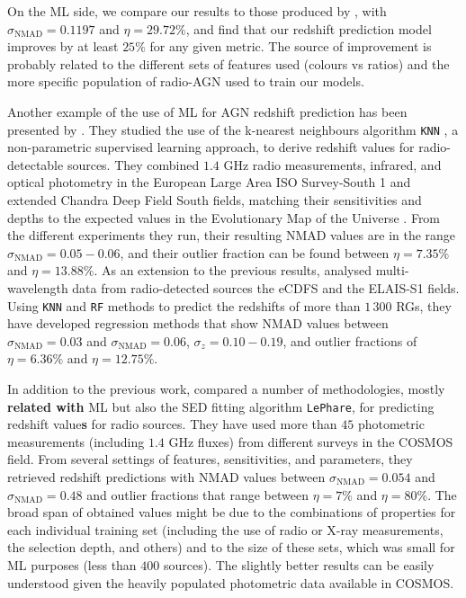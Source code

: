\documentclass{aa}
\begin{document}
On the ML side, we compare our results to those produced by \citet{2021Galax...9...86C}, with $\sigma_{\mathrm{NMAD}} = 0.1197$ and $\eta = 29.72 \%$, and find that our redshift prediction model improves by at least $25 \%$ for any given metric.
The source of improvement is probably related to the different sets of features used (colours vs ratios) and the more specific population of radio-AGN used to train our models.

Another example of the use of ML for AGN redshift prediction has been presented by \citet{2019PASP..131j8003L}. They studied the use of the k-nearest neighbours algorithm \verb|KNN| \citep{1053964}, a non-parametric supervised learning approach, to derive redshift values for radio-detectable sources. They combined $1.4$ GHz radio measurements, infrared, and optical photometry in the European Large Area ISO Survey-South 1 \citep[ELAIS-S1;][]{2000MNRAS.316..749O} and extended Chandra Deep Field South \citep[eCDFS;][]{2005ApJS..161...21L} fields, matching their sensitivities and depths to the expected values in the Evolutionary Map of the Universe \citep[EMU;][]{2011PASA...28..215N}. From the different experiments they run, their resulting NMAD values are in the range ${\sigma_{\mathrm{NMAD}} = 0.05 - 0.06}$, and their outlier fraction can be found between ${\eta = 7.35 \%}$ and ${\eta = 13.88 \%}$. 
As an extension to the previous results, \citet{LUKEN2022100557} analysed multi-wavelength data from radio-detected sources the eCDFS and the ELAIS-S1 fields. Using \texttt{KNN} and \texttt{RF} methods to predict the redshifts of more than $1\,300$ RGs, they have developed regression methods that show NMAD values between ${\sigma_{\mathrm{NMAD}} = 0.03}$ and ${\sigma_{\mathrm{NMAD}} = 0.06}$, ${\sigma_{z} = 0.10 - 0.19}$, and outlier fractions of ${\eta = 6.36 \%}$ and ${\eta = 12.75 \%}$.

In addition to the previous work, \citet{2019PASP..131j8004N} compared a number of methodologies, mostly \textbf{related with} ML but also the SED fitting algorithm \texttt{LePhare}, for predicting redshift value\textbf{s} for radio sources. They have used more than $45$ photometric measurements (including $1.4$ GHz fluxes) from different surveys in the COSMOS field. From several settings of features, sensitivities, and parameters, they retrieved redshift predictions with NMAD values between ${\sigma_{\mathrm{NMAD}} = 0.054}$ and ${\sigma_{\mathrm{NMAD}} = 0.48}$ and outlier fractions that range between ${\eta = 7 \%}$ and ${\eta = 80 \%}$. The broad span of obtained values might be due to the combinations of properties for each individual training set (including the use of radio or X-ray measurements, the selection depth, and others) and to the size of these sets, which was small for ML purposes (less than $400$ sources). The slightly better results can be easily understood given the heavily populated photometric data available in COSMOS.
\end{document}
